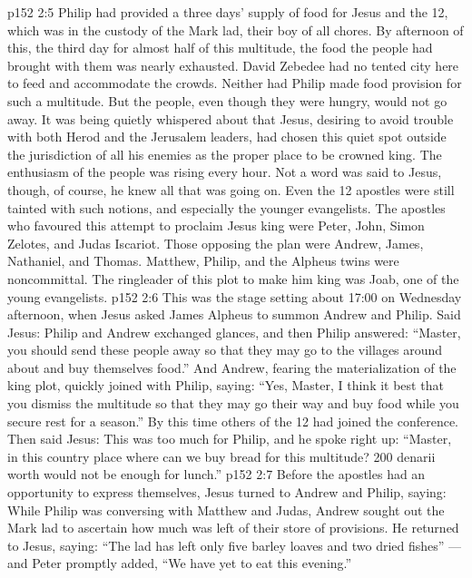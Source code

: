\vs p152 2:5 \pc Philip had provided a three days’ supply of food for Jesus and the 12, which was in the custody of the Mark lad, their boy of all chores. By afternoon of this, the third day for almost half of this multitude, the food the people had brought with them was nearly exhausted. David Zebedee had no tented city here to feed and accommodate the crowds. Neither had Philip made food provision for such a multitude. But the people, even though they were hungry, would not go away. It was being quietly whispered about that Jesus, desiring to avoid trouble with both Herod and the Jerusalem leaders, had chosen this quiet spot outside the jurisdiction of all his enemies as the proper place to be crowned king. The enthusiasm of the people was rising every hour. Not a word was said to Jesus, though, of course, he knew all that was going on. Even the 12 apostles were still tainted with such notions, and especially the younger evangelists. The apostles who favoured this attempt to proclaim Jesus king were Peter, John, Simon Zelotes, and Judas Iscariot. Those opposing the plan were Andrew, James, Nathaniel, and Thomas. Matthew, Philip, and the Alpheus twins were noncommittal. The ringleader of this plot to make him king was Joab, one of the young evangelists.
\vs p152 2:6 \pc This was the stage setting about 17:00 on Wednesday afternoon, when Jesus asked James Alpheus to summon Andrew and Philip. Said Jesus:  Philip and Andrew exchanged glances, and then Philip answered: “Master, you should send these people away so that they may go to the villages around about and buy themselves food.” And Andrew, fearing the materialization of the king plot, quickly joined with Philip, saying: “Yes, Master, I think it best that you dismiss the multitude so that they may go their way and buy food while you secure rest for a season.” By this time others of the 12 had joined the conference. Then said Jesus:  This was too much for Philip, and he spoke right up: “Master, in this country place where can we buy bread for this multitude? 200 denarii worth would not be enough for lunch.”
\vs p152 2:7 Before the apostles had an opportunity to express themselves, Jesus turned to Andrew and Philip, saying:  While Philip was conversing with Matthew and Judas, Andrew sought out the Mark lad to ascertain how much was left of their store of provisions. He returned to Jesus, saying: “The lad has left only five barley loaves and two dried fishes” --- and Peter promptly added, “We have yet to eat this evening.”
